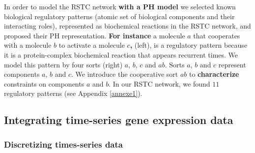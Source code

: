 \documentclass[11pt,a4paper,twoside]{epig}
\begin{document}

In order to model the RSTC network \textbf{with a PH model} we selected known biological regulatory patterns (atomic set of biological components and their interacting roles), represented 
as biochemical reactions in the RSTC network, and proposed their PH representation. 
\textbf{For instance} a molecule $a$ that cooperates with a molecule $b$ to activate a molecule $c$\textbf{,}  (left), is a regulatory pattern because it is a protein-complex biochemical reaction that appears recurrent times.  
We model this pattern by four sorts  (right) $a$, $b$, $c$ and $ab$. Sorts $a$, $b$ and $c$
represent components $a$, $b$ and $c$. We introduce the cooperative sort $ab$ to \textbf{characterize} constraints on components $a$ and $b$.
In our RSTC network, we found $11$ regulatory patterns (see Appendix \ref{annexe1}). 



\subsection{Integrating time-series gene expression data}


\subsubsection{Discretizing times-series data}
\end{document}
